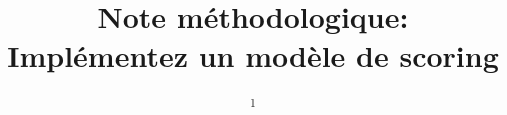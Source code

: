 \title{Note méthodologique:\\ Implémentez un modèle de scoring} %


\author{
	\newline\newline %
	\textsuperscript{1}\\ %
}


